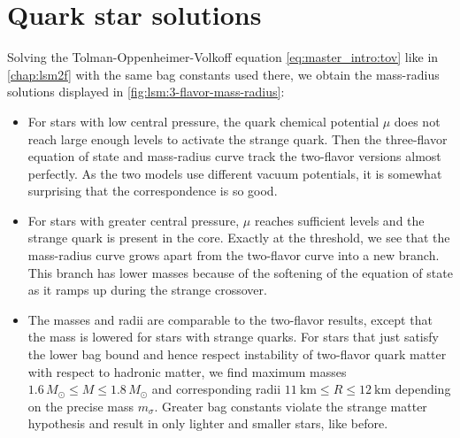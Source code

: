 \section{Quark star solutions}

Solving the Tolman-Oppenheimer-Volkoff equation \eqref{eq:master_intro:tov} like in \cref{chap:lsm2f} with the same bag constants used there,
we obtain the mass-radius solutions displayed in \cref{fig:lsm:3-flavor-mass-radius}:
\begin{itemize}
\item For stars with low central pressure,
      the quark chemical potential $\mu$ does not reach large enough levels to activate the strange quark.
      Then the three-flavor equation of state and mass-radius curve track the two-flavor versions almost perfectly.
      As the two models use different vacuum potentials, it is somewhat surprising that the correspondence is so good.
\item For stars with greater central pressure, $\mu$ reaches sufficient levels and the strange quark is present in the core.
      Exactly at the threshold, we see that the mass-radius curve grows apart from the two-flavor curve into a new branch.
      This branch has lower masses because of the softening of the equation of state as it ramps up during the strange crossover.
\item The masses and radii are comparable to the two-flavor results, except that the mass is lowered for stars with strange quarks.
      For stars that just satisfy the lower bag bound and hence respect instability of two-flavor quark matter with respect to hadronic matter,
      we find maximum masses $1.6 \, M_\odot\leq M \leq 1.8 \, M_\odot$ and corresponding radii $\SI{11}{\kilo\meter} \leq R \leq \SI{12}{\kilo\meter}$ depending on the precise mass $m_\sigma$.
      Greater bag constants violate the strange matter hypothesis and result in only lighter and smaller stars, like before.
\end{itemize}


